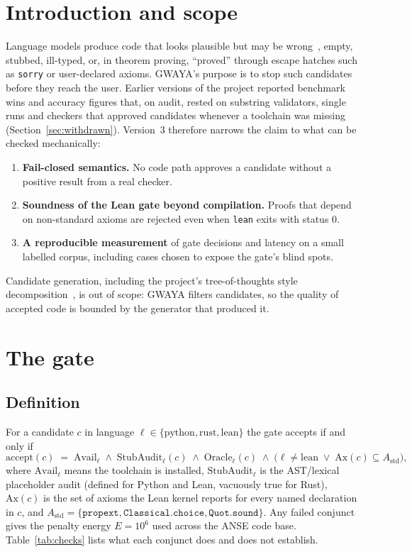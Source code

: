 \documentclass[11pt,a4paper,onecolumn]{article}
\begin{document}
\section{Introduction and scope}
Language models produce code that looks plausible but may be wrong~\cite{codex}, empty, stubbed,
ill-typed, or, in theorem proving, ``proved'' through escape hatches such as
\texttt{sorry} or user-declared axioms. GWAYA's purpose is to stop such candidates
before they reach the user. Earlier versions of the project reported benchmark
wins and accuracy figures that, on audit, rested on substring validators, single
runs and checkers that approved candidates whenever a toolchain was missing
(Section~\ref{sec:withdrawn}). Version~3 therefore narrows the claim to what can
be checked mechanically:
\begin{enumerate}
\item \textbf{Fail-closed semantics.} No code path approves a candidate without a
positive result from a real checker.
\item \textbf{Soundness of the Lean gate beyond compilation.} Proofs that depend on
non-standard axioms are rejected even when \texttt{lean} exits with status 0.
\item \textbf{A reproducible measurement} of gate decisions and latency on a small
labelled corpus, including cases chosen to expose the gate's blind spots.
\end{enumerate}
Candidate generation, including the project's tree-of-thoughts style
decomposition~\cite{tot}, is out of scope: GWAYA filters candidates, so the quality
of accepted code is bounded by the generator that produced it.

\section{The gate}
\subsection{Definition}
For a candidate $c$ in language $\ell \in \{\text{python},\text{rust},\text{lean}\}$
the gate accepts if and only if
\[
\mathrm{accept}(c) \;=\; \mathrm{Avail}_\ell \;\wedge\; \mathrm{StubAudit}_\ell(c)
\;\wedge\; \mathrm{Oracle}_\ell(c) \;\wedge\;
\bigl(\ell \neq \text{lean} \;\vee\; \mathrm{Ax}(c) \subseteq A_{\text{std}}\bigr),
\]
where $\mathrm{Avail}_\ell$ means the toolchain is installed, $\mathrm{StubAudit}_\ell$
is the AST/lexical placeholder audit (defined for Python and Lean, vacuously true for
Rust), $\mathrm{Ax}(c)$ is the set of axioms the Lean kernel reports for every named
declaration in $c$, and
$A_{\text{std}} = \{\texttt{propext}, \texttt{Classical.choice}, \texttt{Quot.sound}\}$.
Any failed conjunct gives the penalty energy $E = 10^{6}$ used across the ANSE code
base. Table~\ref{tab:checks} lists what each conjunct does and does not establish.
\end{document}
